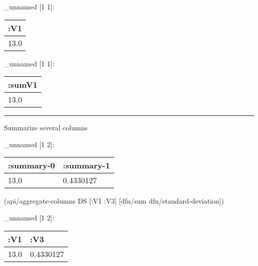 \documentclass[]{article}
\newenvironment{Shaded}{\begin{snugshade}}{\end{snugshade}}
\newcommand{\AttributeTok}[1]{\textcolor[rgb]{0.77,0.63,0.00}{#1}}
\newcommand{\NormalTok}[1]{#1}
\newcommand{\VariableTok}[1]{\textcolor[rgb]{0.00,0.00,0.00}{#1}}
\begin{document}
\_unnamed {[}1 1{]}:

\begin{longtable}[]{@{}l@{}}
\toprule
:V1\tabularnewline
\midrule
\endhead
13.0\tabularnewline
\bottomrule
\end{longtable}

\begin{Shaded}
\end{Shaded}

\_unnamed {[}1 1{]}:

\begin{longtable}[]{@{}l@{}}
\toprule
:sumV1\tabularnewline
\midrule
\endhead
13.0\tabularnewline
\bottomrule
\end{longtable}

\begin{center}\rule{0.5\linewidth}{0.5pt}\end{center}

Summarize several columns

\begin{Shaded}
\end{Shaded}

\_unnamed {[}1 2{]}:

\begin{longtable}[]{@{}ll@{}}
\toprule
:summary-0 & :summary-1\tabularnewline
\midrule
\endhead
13.0 & 0.4330127\tabularnewline
\bottomrule
\end{longtable}

\begin{Shaded}
\begin{Highlighting}[]
\NormalTok{(api/aggregate-columns DS [}\AttributeTok{:V1} \AttributeTok{:V3}\NormalTok{] [dfn/sum}
\NormalTok{                                     dfn/standard-deviation])}
\end{Highlighting}
\end{Shaded}

\_unnamed {[}1 2{]}:

\begin{longtable}[]{@{}ll@{}}
\toprule
:V1 & :V3\tabularnewline
\midrule
\endhead
13.0 & 0.4330127\tabularnewline
\bottomrule
\end{longtable}
\end{document}
